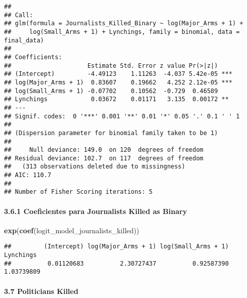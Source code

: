 \documentclass[
  11pt,
]{article}
\newenvironment{Shaded}{\begin{snugshade}}{\end{snugshade}}
\newcommand{\FunctionTok}[1]{\textcolor[rgb]{0.13,0.29,0.53}{\textbf{#1}}}
\newcommand{\NormalTok}[1]{#1}
\begin{document}
\begin{verbatim}
## 
## Call:
## glm(formula = Journalists_Killed_Binary ~ log(Major_Arms + 1) + 
##     log(Small_Arms + 1) + Lynchings, family = binomial, data = final_data)
## 
## Coefficients:
##                     Estimate Std. Error z value Pr(>|z|)    
## (Intercept)         -4.49123    1.11263  -4.037 5.42e-05 ***
## log(Major_Arms + 1)  0.83607    0.19662   4.252 2.12e-05 ***
## log(Small_Arms + 1) -0.07702    0.10562  -0.729  0.46589    
## Lynchings            0.03672    0.01171   3.135  0.00172 ** 
## ---
## Signif. codes:  0 '***' 0.001 '**' 0.01 '*' 0.05 '.' 0.1 ' ' 1
## 
## (Dispersion parameter for binomial family taken to be 1)
## 
##     Null deviance: 149.0  on 120  degrees of freedom
## Residual deviance: 102.7  on 117  degrees of freedom
##   (313 observations deleted due to missingness)
## AIC: 110.7
## 
## Number of Fisher Scoring iterations: 5
\end{verbatim}

\paragraph{3.6.1 Coeficientes para Journalists Killed as
Binary}\label{coeficientes-para-journalists-killed-as-binary}

\begin{Shaded}
\begin{Highlighting}[]
\FunctionTok{exp}\NormalTok{(}\FunctionTok{coef}\NormalTok{(logit\_model\_journalists\_killed))}
\end{Highlighting}
\end{Shaded}

\begin{verbatim}
##         (Intercept) log(Major_Arms + 1) log(Small_Arms + 1)           Lynchings 
##          0.01120683          2.30727437          0.92587390          1.03739809
\end{verbatim}

\paragraph{3.7 Politicians Killed}\label{politicians-killed}
\end{document}
